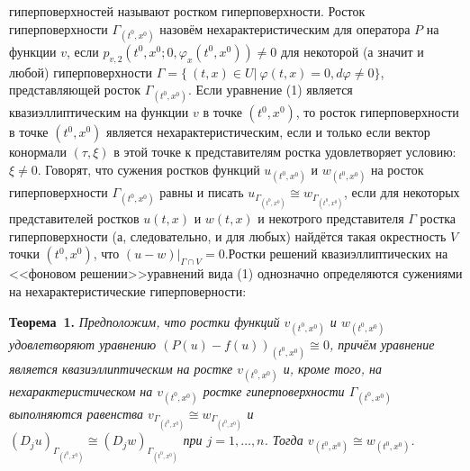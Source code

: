 гиперповерхностей называют ростком гиперповерхности.
Росток гиперповерхности $\Gamma_{(t^0,x^0)}$ назовём нехарактеристическим
для оператора $P$ на функции $v$, если
$p_{v,2}(t^0,x^0;0,\varphi_{x}(t^0,x^0))\not=0$
для некоторой (а значит и любой) гиперповерхности 
$\Gamma= \{~(t,x) \in U \vert~\varphi (t,x) =0, d\varphi\not=0\}$, представляющей росток $\Gamma_{(t^0,x^0)}$.
Если уравнение (1) является квазиэллиптическим на функции $v$ в точке $(t^0,x^0)$, то росток гиперповерхности в точке $(t^0,x^0)$ является нехарактеристическим, если и только если вектор конормали $(\tau,\xi)$ в этой точке к представителям ростка удовлетворяет условию: $\xi\not=0$.
Говорят, что сужения ростков функций $u_{(t^0,x^0)}$ и $w_{(t^0,x^0)}$
на росток гиперповерхности $\Gamma_{(t^0,x^0)}$ равны и писать
$u_{\Gamma_{(t^0,x^0)}}\cong w_{\Gamma_{(t^0,x^0)}}$,
если для некоторых представителей ростков $u(t,x)$ и $w(t,x)$  и некотрого представителя $\Gamma$ ростка гиперповерхности (а, следовательно, и для любых)
найдётся такая окрестность $V$ точки $(t^0,x^0)$,
что $(u-w)|_{\Gamma\cap V}=0$.\linebreak Ростки решений квазиэллиптических на <<фоновом решении>>\linebreak уравнений вида (1) однозначно определяются сужениями на нехарактеристические гиперповерности:


\textbf{Теорема~1.} {\it 
Предположим, что ростки функций $v_{(t^0,x^0)}$ и $w_{(t^0,x^0)}$ удовлетворяют уравнению $(P(u)-f(u))_{(t^0,x^0)}\cong 0$, причём уравнение
является квазиэллиптическим на ростке $v_{(t^0,x^0)}$ и, кроме того, на нехарактеристическом на $v_{(t^0,x^0)}$ ростке гиперповерхности
$\Gamma_{(t^0,x^0)}$ выполняются равенства 
$v_{\Gamma_{(t^0,x^0)}}\cong w_{\Gamma_{(t^0,x^0)}}$ и 
\\$(D_ju)_{\Gamma_{(t^0,x^0)}}\cong (D_jw)_{\Gamma_{(t^0,x^0)}}$ при
$j=1,\dots,n$. Тогда $v_{(t^0,x^0)}\cong w_{(t^0,x^0)}$.
}

